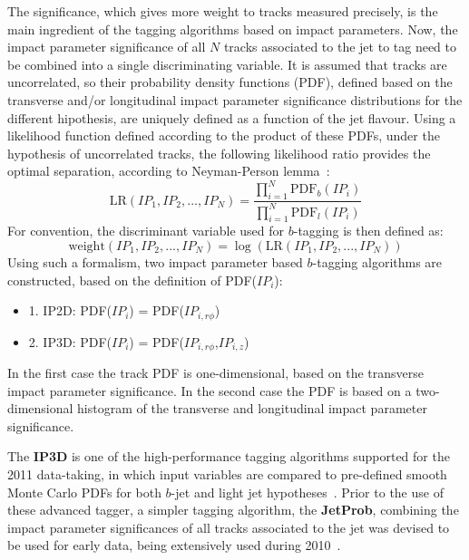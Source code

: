 The significance, which gives more weight to tracks measured precisely, is the main ingredient of the tagging algorithms based on impact parameters. Now, the impact parameter significance of all $N$ tracks associated to the jet to tag need to be combined into a single discriminating variable. It is assumed that tracks are uncorrelated, so their probability density functions (PDF), defined based on the transverse and/or longitudinal impact parameter significance distributions for the different hipothesis, are uniquely  defined as a function of the jet flavour. Using a likelihood function defined according to the product of these PDFs, under the hypothesis of uncorrelated tracks, the following likelihood ratio provides the optimal separation, according to Neyman-Person lemma~\cite{1933RSPTA.231..289N}:
%
\begin{equation}
\mbox{LR}(IP_1,IP_2,...,IP_N) = \frac{\prod_{i=1}^N \mbox{PDF}_b(IP_i)}{\prod_{i=1}^N \mbox{PDF}_l(IP_i)}
\end{equation}
%
For convention, the discriminant variable used for $b$-tagging is then defined as:
%
\begin{equation}
\mbox{weight}(IP_1,IP_2,...,IP_N) = \log(\mbox{LR}(IP_1,IP_2,...,IP_N))
\end{equation}
%
Using such a formalism, two impact parameter based $b$-tagging algorithms are constructed, based on the definition of PDF($IP_i$):

\begin{itemize}
\item
1. IP2D: PDF($IP_i$) = PDF($IP_{i,r\phi}$)
\item
2. IP3D:  PDF($IP_i$) = PDF($IP_{i,r\phi}$,$IP_{i,z}$)
\end{itemize}

In the first case the track PDF is one-dimensional, based on the transverse impact parameter significance. In the second case the PDF is based on a two-dimensional histogram of the transverse and longitudinal impact parameter significance. 

The \textbf{IP3D} is one of the high-performance tagging algorithms supported for the 2011 data-taking, in which input variables are compared to pre-defined smooth Monte Carlo PDFs for both $b$-jet and light jet hypotheses~\cite{ATLAS-CONF-2011-102}.  Prior to the use of these advanced tagger, a simpler tagging algorithm, the \textbf{JetProb}, combining the impact parameter significances of all tracks associated to the jet was devised to be used for early data, being extensively used during 2010~\cite{ATLAS-CONF-2010-091}. 


